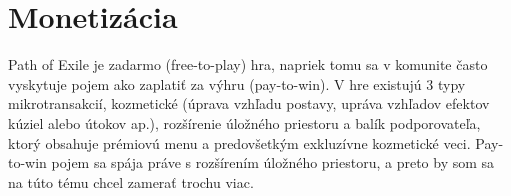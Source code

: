\documentclass[10pt,twoside,slovak,a4paper]{article}
\begin{document}









\section{Monetizácia}
Path of Exile je zadarmo (free-to-play) hra, napriek tomu sa v komunite často vyskytuje pojem ako zaplatiť za výhru (pay-to-win). V hre existujú 3 typy mikrotransakcií, kozmetické (úprava vzhľadu postavy, upráva vzhľadov efektov kúziel alebo útokov ap.), rozšírenie úložného priestoru a balík podporovateľa, ktorý obsahuje prémiovú menu a predovšetkým exkluzívne kozmetické veci. Pay-to-win pojem sa spája práve s rozšírením úložného priestoru, a preto by som sa na túto tému chcel zamerať trochu viac.\\
\end{document}
